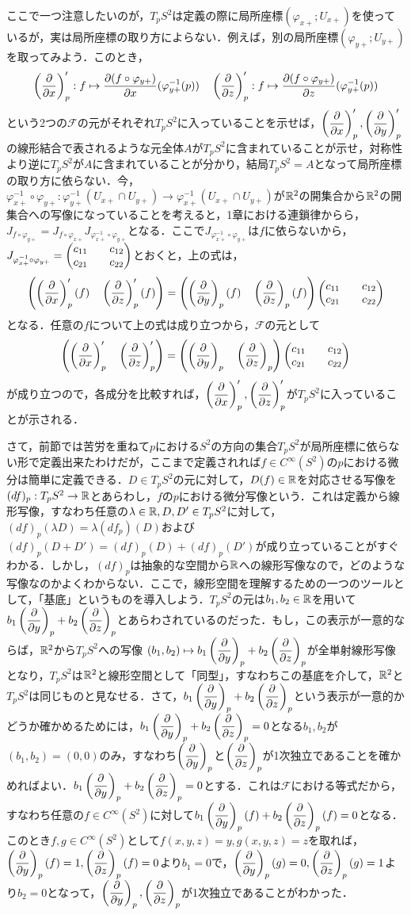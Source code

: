 ここで一つ注意したいのが，$T_pS^2$は定義の際に局所座標$(\varphi_{x+};U_{x+})$を使っているが，実は局所座標の取り方によらない．例えば，別の局所座標$(\varphi_{y+};U_{y+})$を取ってみよう．このとき，
$$
\delxp':f\mapsto \dfrac{\partial (f\circ\varphi_{y+})}{\partial x}(\varphi_{y+}^{-1}(p))\quad
\delzp':f\mapsto \dfrac{\partial (f\circ\varphi_{y+})}{\partial z}(\varphi_{y+}^{-1}(p))
$$
という2つの$\mathcal F$の元がそれぞれ$T_pS^2$に入っていることを示せば，$\delxp',\delyp'$の線形結合で表されるような元全体$A$が$T_pS^2$に含まれていることが示せ，対称性より逆に$T_pS^2$が$A$に含まれていることが分かり，結局$T_pS^2=A$となって局所座標の取り方に依らない．今，$\varphi_{x+}^{-1}\circ\varphi_{y+}:\varphi_{y+}^{-1}(U_{x+}\cap U_{y+})\rightarrow\varphi_{x+}^{-1}(U_{x+}\cap U_{y+})$が$\realnum^2$の開集合から$\realnum^2$の開集合への写像になっていることを考えると，1章における連鎖律からら，$J_{f\circ\varphi_{y+}}=J_{f\circ\varphi_{x+}}J_{\varphi_{x+}^{-1}\circ\varphi_{y+}}$となる．ここで$J_{\varphi_{x+}^{-1}\circ\varphi_{y+}}$は$f$に依らないから，$J_{\varphi_{x+}^{-1}\circ\varphi_{y+}}=\vecb c_{11} && c_{12} \\ c_{21} && c_{22}\vece$とおくと，上の式は，
$$
\left(\delxp'(f)\quad\delzp'(f)\right)=\left(\delyp(f)\quad\delzp(f)\right)\vecb c_{11} && c_{12} \\ c_{21} && c_{22}\vece
$$
となる．任意の$f$について上の式は成り立つから，$\mathcal F$の元として
$$
\left(\delxp'\quad\delzp'\right)=\left(\delyp\quad\delzp\right)\vecb c_{11} && c_{12} \\ c_{21} && c_{22}\vece
$$
が成り立つので，各成分を比較すれば，$\delxp',\delzp'$が$T_pS^2$に入っていることが示される．


さて，前節では苦労を重ねて$p$における$S^2$の方向の集合$T_pS^2$が局所座標に依らない形で定義出来たわけだが，ここまで定義されれば$f\in C^{\infty}(S^2)$の$p$における微分は簡単に定義できる．$D\in T_pS^2$の元に対して，$D(f)\in \realnum$を対応させる写像を$(df)_p:T_pS^2\rightarrow \realnum$とあらわし，$f$の$p$における微分写像という．これは定義から線形写像，すなわち任意の$\lambda\in\realnum, D,D'\in T_pS^2$に対して，$(df)_p(\lambda D)=\lambda (df_p)(D)$および$(df)_p(D+D')=(df)_p(D)+(df)_p(D')$が成り立っていることがすぐわかる．しかし，$(df)_p$は抽象的な空間から$\realnum$への線形写像なので，どのような写像なのかよくわからない．ここで，線形空間を理解するための一つのツールとして，「基底」というものを導入しよう．$T_pS^2$の元は$b_1,b_2\in\realnum$を用いて$b_1\delyp+b_2\delzp$とあらわされているのだった．もし，この表示が一意的ならば，$\realnum^2$から$T_pS^2$への写像
$(b_1,b_2)\mapsto b_1\delyp+b_2\delzp$が全単射線形写像となり，$T_pS^2$は$\realnum^2$と線形空間として「同型」，すなわちこの基底を介して，$\realnum^2$と$T_pS^2$は同じものと見なせる．さて，$b_1\delyp+b_2\delzp$という表示が一意的かどうか確かめるためには，$b_1\delyp+b_2\delzp=0$となる$b_1,b_2$が$(b_1,b_2)=(0,0)$のみ，すなわち$\delyp$と$\delzp$が1次独立であることを確かめればよい．$b_1\delyp+b_2\delzp=0$とする．これは$\mathcal F$における等式だから，すなわち任意の$f\in C^{\infty}(S^2)$に対して$b_1\delyp(f)+b_2\delzp(f)=0$となる．このとき$f,g\in C^{\infty}(S^2)$として$f(x,y,z)=y,g(x,y,z)=z$を取れば，$\delyp(f)=1,\delzp(f)=0$より$b_1=0$で，$\delyp(g)=0,\delzp(g)=1$より$b_2=0$となって，$\delyp,\delzp$が1次独立であることがわかった．

